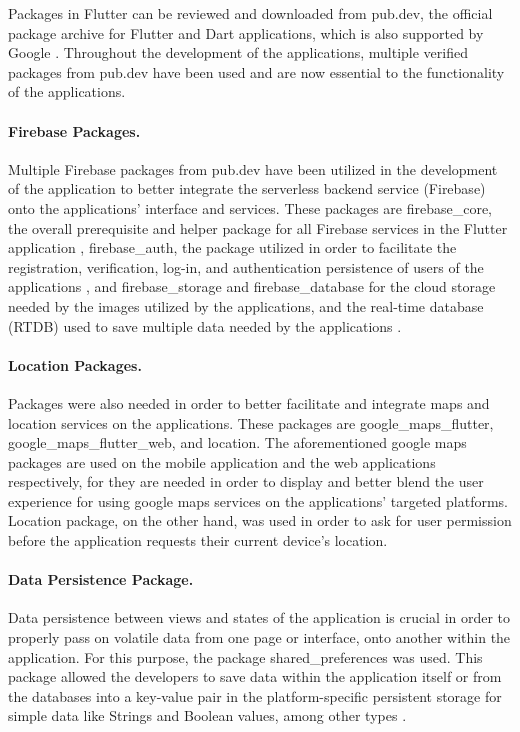Packages in Flutter can be reviewed and downloaded from pub.dev, the official package archive for Flutter and Dart applications, which is also supported by Google \cite{pubdev}. Throughout the development of the applications, multiple verified packages from pub.dev have been used and are now essential to the functionality of the applications.

\paragraph{Firebase Packages.} Multiple Firebase packages from pub.dev have been utilized in the development of the application to better integrate the serverless backend service (Firebase) onto the applications' interface and services. These packages are firebase\_core, the overall prerequisite and helper package for all Firebase services in the Flutter application \cite{firebaseCore}, firebase\_auth, the package utilized in order to facilitate the registration, verification, log-in, and authentication persistence of users of the applications \cite{firebaseAuth}, and firebase\_storage and firebase\_database for the cloud storage needed by the images utilized by the applications, and the real-time database (RTDB) used to save multiple data needed by the applications \cite{firebaseAuth, firebaseStorage}.

\paragraph{Location Packages.} Packages were also needed in order to better facilitate and integrate maps and location services on the applications. These packages are google\_maps\_flutter, google\_maps\_flutter\_web, and location. The aforementioned google maps packages are used on the mobile application and the web applications respectively, for they are needed in order to display and better blend the user experience for using google maps services on the applications' targeted platforms. Location package, on the other hand, was used in order to ask for user permission before the application requests their current device's location.

\paragraph{Data Persistence Package.} Data persistence between views and states of the application is crucial in order to properly pass on volatile data from one page or interface, onto another within the application. For this purpose, the package shared\_preferences was used. This package allowed the developers to save data within the application itself or from the databases into a key-value pair in the platform-specific persistent storage for simple data like Strings and Boolean values, among other types \cite{sharedPreferences}.


